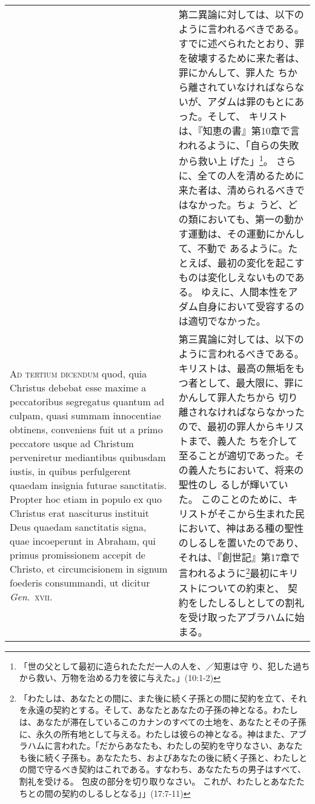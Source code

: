 \documentclass[10pt]{jsarticle} %
\begin{document}
\begin{longtable}{p{21em}p{21em}}
&

第二異論に対しては、以下のように言われるべきである。
すでに述べられたとおり、罪を破壊するために来た者は、罪にかんして、罪人た
 ちから離されていなければならないが、アダムは罪のもとにあった。そして、
 キリストは、『知恵の書』第10章で言われるように、「自らの失敗から救い上
 げた」\footnote{「世の父として最初に造られたただ一人の人を、／知恵は守
 り、犯した過ちから救い、万物を治める力を彼に与えた。」(10:1-2)}。
さらに、全ての人を清めるために来た者は、清められるべきではなかった。ちょ
 うど、どの類においても、第一の動かす運動は、その運動にかんして、不動で
 あるように。たとえば、最初の変化を起こすものは変化しえないものである。
 ゆえに、人間本性をアダム自身において受容するのは適切でなかった。

\\



{\scshape Ad tertium dicendum} quod, quia Christus debebat esse maxime a
peccatoribus segregatus quantum ad culpam, quasi summam innocentiae
obtinens, conveniens fuit ut a primo peccatore usque ad Christum
perveniretur mediantibus quibusdam iustis, in quibus perfulgerent
quaedam insignia futurae sanctitatis. Propter hoc etiam in populo ex quo
Christus erat nasciturus instituit Deus quaedam sanctitatis signa, quae
incoeperunt in Abraham, qui primus promissionem accepit de Christo, et
circumcisionem in signum foederis consummandi, ut dicitur {\itshape Gen}.~{\scshape xvii}.


&


第三異論に対しては、以下のように言われるべきである。
キリストは、最高の無垢をもつ者として、最大限に、罪にかんして罪人たちから
 切り離されなければならなかったので、最初の罪人からキリストまで、義人た
 ちを介して至ることが適切であった。その義人たちにおいて、将来の聖性のし
 るしが輝いていた。
このことのために、キリストがそこから生まれた民において、神はある種の聖性
 のしるしを置いたのであり、それは、『創世記』第17章で言われるように\footnote{「わたしは、あなたとの間に、また後に続く子孫との間に契約を立て、それを永遠の契約とする。そして、あなたとあなたの子孫の神となる。わたしは、あなたが滞在しているこのカナンのすべての土地を、あなたとその子孫に、永久の所有地として与える。わたしは彼らの神となる。神はまた、アブラハムに言われた。「だからあなたも、わたしの契約を守りなさい、あなたも後に続く子孫も。あなたたち、およびあなたの後に続く子孫と、わたしとの間で守るべき契約はこれである。すなわち、あなたたちの男子はすべて、割礼を受ける。
包皮の部分を切り取りなさい。
 これが、わたしとあなたたちとの間の契約のしるしとなる」」(17:7-11)}最初にキリストについての約束と、
 契約をしたしるしとしての割礼を受け取ったアブラハムに始まる。

\\






\end{longtable}
\end{document}
